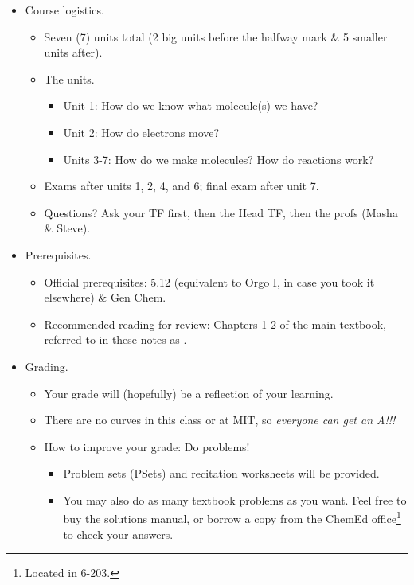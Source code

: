 \documentclass[../notes.tex]{subfiles}
\begin{document}
\begin{itemize}
\begin{itemize}
    \end{itemize}
    \item Course logistics.
    \begin{itemize}
        \item Seven (7) units total (2 big units before the halfway mark \& 5 smaller units after).
        \item The units.
        \begin{itemize}
            \item Unit 1: How do we know what molecule(s) we have?
            \item Unit 2: How do electrons move?
            \item Units 3-7: How do we make molecules? How do reactions work?
        \end{itemize}
        \item Exams after units 1, 2, 4, and 6; final exam after unit 7.
        \item Questions? Ask your TF first, then the Head TF, then the profs (Masha \& Steve).
    \end{itemize}
    \item Prerequisites.
    \begin{itemize}
        \item Official prerequisites: 5.12 (equivalent to Orgo I, in case you took it elsewhere) \& Gen Chem.
        \item Recommended reading for review: Chapters 1-2 of the main textbook, referred to in these notes as \textcite{bib:Clayden}.
    \end{itemize}
    \item Grading.
    \begin{itemize}
        \item Your grade will (hopefully) be a reflection of your learning.
        \item There are no curves in this class or at MIT, so \emph{everyone can get an A!!!}
        \item How to improve your grade: Do problems!
        \begin{itemize}
            \item Problem sets (PSets) and recitation worksheets will be provided.
            \item You may also do as many textbook problems as you want. Feel free to buy the solutions manual, or borrow a copy from the ChemEd office\footnote{Located in 6-203.} to check your answers.
        \end{itemize}

\end{itemize}
\end{itemize}
\end{document}
